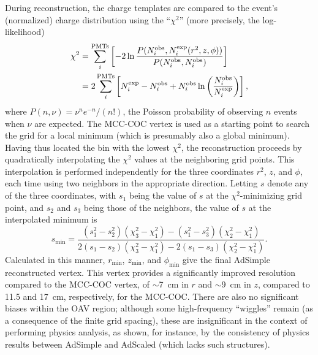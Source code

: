 \documentclass[../thesis.tex]{subfiles}
\begin{document}
During reconstruction, the charge templates are compared to the event's
(normalized) charge distribution using the ``$\chi^2$'' (more precisely, the
log-likelihood)
\begin{align*}
  \chi^2 &= \sum_i^{\mathrm{PMTs}}\left[ -2 \ln \frac{P(N_i^{\mathrm{obs}}, N_i^{\mathrm{exp}}(r^2, z, \phi))}
           {P(N_i^{\mathrm{obs}}, N_i^{\mathrm{obs}})} \right] \\
         &= 2 \sum_i^{\mathrm{PMTs}} \left[ N_i^{\mathrm{exp}} - N_i^{\mathrm{obs}}+ N_i^{\mathrm{obs}} \ln \left( \frac{N_i^{\mathrm{obs}}}{N_i^{\mathrm{exp}}} \right) \right],
\end{align*}
where $P(n, \nu) = \nu^n e^{-n} / (n!)$, the Poisson probability of observing
$n$ events when $\nu$ are expected. The MCC-COC vertex is used as a starting
point to search the grid for a local minimum (which is presumably also a global
minimum). Having thus located the bin with the lowest $\chi^2$, the
reconstruction proceeds by quadratically interpolating the $\chi^2$ values at
the neighboring grid points. This interpolation is performed independently for
the three coordinates $r^2$, $z$, and $\phi$, each time using two neighbors in
the appropriate direction. Letting $s$ denote any of the three coordinates, with
$s_1$ being the value of $s$ at the $\chi^2$-minimizing grid point, and $s_2$
and $s_3$ being those of the neighbors, the value of $s$ at the interpolated
minimum is
\begin{equation*}
  s_{\mathrm{min}} = \frac{(s_1^2 - s_2^2)(\chi_3^2 - \chi_1^2) - (s_1^2 - s_3^2)(\chi_2^2 - \chi_1^2)}{2(s_1 - s_2)(\chi_3^2 - \chi_1^2) - 2(s_1 - s_3)(\chi_2^2 - \chi_1^2)}.
\end{equation*}
Calculated in this manner, $r_{\mathrm{min}}$, $z_{\mathrm{min}}$, and
$\phi_{\mathrm{min}}$ give the final AdSimple reconstructed vertex. This vertex
provides a significantly improved resolution compared to the MCC-COC vertex, of
$\sim$7~cm in $r$ and $\sim$9~cm in $z$, compared to 11.5 and 17~cm,
respectively, for the MCC-COC. There are also no significant biases within the
OAV region; although some high-frequency ``wiggles'' remain (as a consequence of
the finite grid spacing), these are insignificant in the context of performing
physics analysis, as shown, for instance, by the consistency of physics results
between AdSimple and AdScaled (which lacks such structures).
\end{document}
